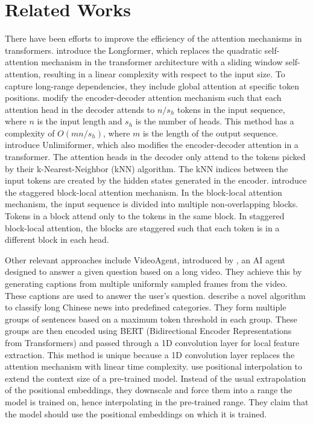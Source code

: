 \section{Related Works}
\label{sec:related-works}

There have been efforts to improve the efficiency of the attention mechanisms in transformers.
\citet{beltagy2020longformer} introduce the Longformer, which replaces the quadratic self-attention mechanism in the transformer architecture with a sliding window self-attention, resulting in a linear complexity with respect to the input size.
To capture long-range dependencies, they include global attention at specific token positions.
\citet{huang-etal-2021-efficient} modify the encoder-decoder attention mechanism such that each attention head in the decoder attends to $n/s_h$ tokens in the input sequence, where $n$ is the input length and $s_h$ is the number of heads.
This method has a complexity of $O(mn/s_h)$, where $m$ is the length of the output sequence.
\citet{bertsch2023unlimiformer} introduce Unlimiformer, which also modifies the encoder-decoder attention in a transformer.
The attention heads in the decoder only attend to the tokens picked by their k-Nearest-Neighbor (kNN) algorithm.
The kNN indices between the input tokens are created by the hidden states generated in the encoder.
\citet{phang2022investigating} introduce the staggered block-local attention mechanism.
In the block-local attention mechanism, the input sequence is divided into multiple non-overlapping blocks.
Tokens in a block attend only to the tokens in the same block.
In staggered block-local attention, the blocks are staggered such that each token is in a different block in each head.

Other relevant approaches include VideoAgent, introduced by \citet{wang2024videoagent}, an AI agent designed to answer a given question based on a long video.
They achieve this by generating captions from multiple uniformly sampled frames from the video.
These captions are used to answer the user's question.
\citet{chen2022long} describe a novel algorithm to classify long Chinese news into predefined categories.
They form multiple groups of sentences based on a maximum token threshold in each group.
These groups are then encoded using BERT (Bidirectional Encoder Representations from Transformers) \cite{devlin2018bert} and passed through a 1D convolution layer for local feature extraction.
This method is unique because a 1D convolution layer replaces the attention mechanism with linear time complexity.
\citet{chen2023extending} use positional interpolation to extend the context size of a pre-trained model.
Instead of the usual extrapolation of the positional embeddings, they downscale and force them into a range the model is trained on, hence interpolating in the pre-trained range.
They claim that the model should use the positional embeddings on which it is trained.

